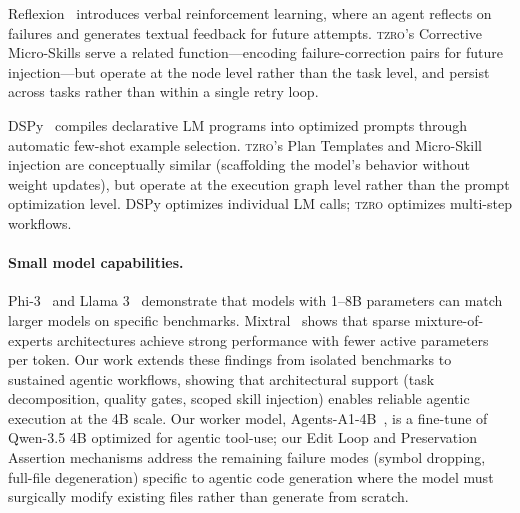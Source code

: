 \documentclass{article}
\begin{document}
Reflexion~\cite{reflexion2023} introduces verbal reinforcement learning, where an agent reflects on failures and generates textual feedback for future attempts.
\textsc{tzro}'s Corrective Micro-Skills serve a related function---encoding failure-correction pairs for future injection---but operate at the node level rather than the task level, and persist across tasks rather than within a single retry loop.

DSPy~\cite{dspy2023} compiles declarative LM programs into optimized prompts through automatic few-shot example selection.
\textsc{tzro}'s Plan Templates and Micro-Skill injection are conceptually similar (scaffolding the model's behavior without weight updates), but operate at the execution graph level rather than the prompt optimization level.
DSPy optimizes individual LM calls; \textsc{tzro} optimizes multi-step workflows.

\paragraph{Small model capabilities.}
Phi-3~\cite{phi3technical2024} and Llama 3~\cite{llama3herd2024} demonstrate that models with 1--8B parameters can match larger models on specific benchmarks.
Mixtral~\cite{mixtral2024} shows that sparse mixture-of-experts architectures achieve strong performance with fewer active parameters per token.
Our work extends these findings from isolated benchmarks to sustained agentic workflows, showing that architectural support (task decomposition, quality gates, scoped skill injection) enables reliable agentic execution at the 4B scale.
Our worker model, Agents-A1-4B~\cite{agentsa1_2025}, is a fine-tune of Qwen-3.5 4B optimized for agentic tool-use; our Edit Loop and Preservation Assertion mechanisms address the remaining failure modes (symbol dropping, full-file degeneration) specific to agentic code generation where the model must surgically modify existing files rather than generate from scratch.
\end{document}
